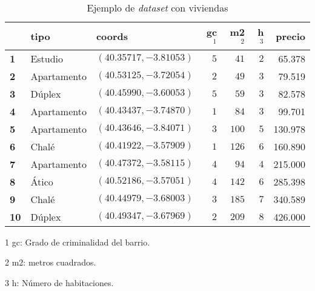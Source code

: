 \begin{table}[H]
  \centering
  \begin{threeparttable}[t]
       \begin{tabular}{l|llrrrr}
        \toprule
        {} &   \textbf{tipo} & \textbf{coords} & \textbf{gc$^1$} & \textbf{m2$^2$} &  \textbf{h$^3$} & \textbf{precio} \\
        \midrule
        \textbf{1} &       Estudio &  $(40.35717, -3.81053)$ &   $5$ &   $41$ & $2$ &  65.378 \\
        \textbf{2} &   Apartamento &  $(40.53125, -3.72054)$ &   $2$ &   $49$ &  $3$ & 79.519 \\
        \textbf{3} &        Dúplex & $(40.45990, -3.60053)$  &   $5$ &   $59$ &  $3$ & 82.578 \\
        \textbf{4} &   Apartamento &  $(40.43437, -3.74870)$ &   $1$ &   $84$ &  $3$ & 99.701 \\
        \textbf{5} &   Apartamento &  $(40.43646, -3.84071)$ &   $3$ &  $100$ & $5$ & 130.978 \\
        \textbf{6} &         Chalé &  $(40.41922, -3.57909)$ &   $1$ &  $126$ & $6$ & 160.890 \\
        \textbf{7} &   Apartamento &  $(40.47372, -3.58115)$ &   $4$ &   $94$ & $4$ & 215.000 \\
        \textbf{8} &         Ático &  $(40.52186, -3.57051)$ &   $4$ &  $142$ & $6$ & 285.398 \\
        \textbf{9} &         Chalé &  $(40.44979, -3.68003)$ &   $3$ &  $185$ & $7$ & 340.589 \\
        \textbf{10} &       Dúplex & $(40.49347, -3.67969)$ & $2$ &  $209$ & $8$ & 426.000 \\
        \bottomrule
         \end{tabular}
     \begin{tablenotes}
     \item[1] gc: Grado de criminalidad del barrio.
     \item[2] m2: metros cuadrados.
     \item[3] h: Número de habitaciones.
   \end{tablenotes}
    \end{threeparttable}%
  \label{tab:houses}%
\caption{Ejemplo de \textit{dataset} con viviendas}
\end{table}%




